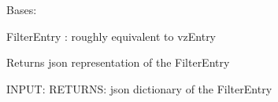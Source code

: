 \documentclass[letterpaper,10pt,english]{sphinxmanual}
\begin{document}
\begin{fulllineitems}
\label{acitoolkit:acitoolkit.FilterEntry}
Bases: {\hyperref[acibaseobject:acibaseobject.BaseACIObject]{}}

FilterEntry :  roughly equivalent to vzEntry

\begin{fulllineitems}
\label{acitoolkit:acitoolkit.FilterEntry.get_json}
Returns json representation of the FilterEntry

INPUT:
RETURNS: json dictionary of the FilterEntry

\end{fulllineitems}


\end{fulllineitems}

\end{document}
